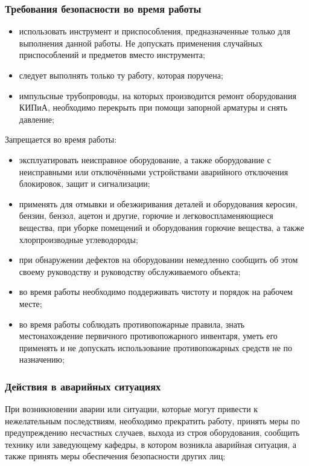 \subsubsection{Требования безопасности во время работы}
\begin{itemize}
\item использовать инструмент и приспособления, предназначенные только для выполнения данной работы. Не допускать применения случайных приспособлений и предметов вместо инструмента;
\item следует выполнять только ту работу, которая поручена;
\item импульсные трубопроводы, на которых производится ремонт оборудования КИПиА, необходимо перекрыть при помощи запорной арматуры и снять давление;
\end{itemize}
Запрещается во время работы:

\begin{itemize}
\item эксплуатировать неисправное оборудование, а также оборудование с неисправными или отключёнными устройствами аварийного отключения блокировок, защит и сигнализации;
\item применять для отмывки и обезжиривания деталей и оборудования керосин, бензин, бензол, ацетон и другие, горючие и легковоспламеняющиеся вещества, при уборке помещений и оборудования горючие вещества, а также хлорпроизводные углеводороды;
\end{itemize}
\begin{itemize}
\item при обнаружении дефектов на оборудовании немедленно сообщить об этом своему руководству и руководству обслуживаемого объекта;
\item во время работы необходимо поддерживать чистоту и порядок на рабочем месте;
\item во время работы соблюдать противопожарные правила, знать местонахождение первичного противопожарного инвентаря, уметь его применять и не допускать использование противопожарных средств не по назначению;
\end{itemize}
\subsubsection{Действия в аварийных ситуациях}

При возникновении аварии или ситуации, которые могут привести к нежелательным последствиям, необходимо прекратить работу, принять меры по предупреждению несчастных случаев, выхода из строя оборудования, сообщить технику или заведующему кафедры, в котором возникла аварийная ситуация, а также принять меры обеспечения безопасности других лиц;

